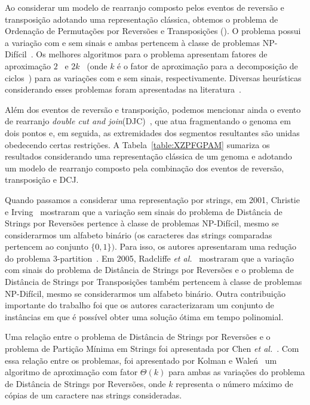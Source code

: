 Ao considerar um modelo de rearranjo composto pelos eventos de reversão e transposição adotando uma representação clássica, obtemos o problema de Ordenação de Permutações por Reversões e Transposições (\SbRT). O problema possui a variação com e sem sinais e ambas pertencem à classe de problemas NP-Difícil~\cite{2019b-oliveira-etal}. Os melhores algoritmos para o problema apresentam fatores de aproximação $2$~\cite{1998-walter-etal} e $2k$~\cite{2008-rahman-etal} (onde $k$ é o fator de aproximação para a decomposição de ciclos~\cite{2013-chen}) para as variações com e sem sinais, respectivamente. Diversas heurísticas considerando esses problemas foram apresentadas na literatura~\cite{2014a-dias-etal,2018-brito-etal}.

Além dos eventos de reversão e transposição, podemos mencionar ainda o evento de rearranjo \emph{double cut and join}(DJC)~\cite{2005-yancopoulos-etal}, que atua fragmentando o genoma em dois pontos e, em seguida, as extremidades dos segmentos resultantes são unidas obedecendo certas restrições. A Tabela~\ref{table:XZPFGPAM} sumariza os resultados considerando uma representação clássica de um genoma e adotando um modelo de rearranjo composto pela combinação dos eventos de reversão, transposição e DCJ. 



Quando passamos a considerar uma representação por strings, em 2001, Christie e Irving~\cite{2001-christie-irving} mostraram que a variação sem sinais do problema de Distância de Strings por Reversões pertence à classe de problemas NP-Difícil, mesmo se considerarmos um alfabeto binário (os caracteres das strings comparadas pertencem ao conjunto $\{0,1\})$. Para isso, os autores apresentaram uma redução do problema 3-partition~\cite{1990-garey-johnson}. Em 2005, Radcliffe \textit{et al.}~\cite{2005-radcliffe-etal} mostraram que a variação com sinais do problema de Distância de Strings por Reversões e o problema de Distância de Strings por Transposições também pertencem à classe de problemas NP-Difícil, mesmo se considerarmos um alfabeto binário. Outra contribuição importante do trabalho foi que os autores caracterizaram um conjunto de instâncias em que é possível obter uma solução ótima em tempo polinomial.

Uma relação entre o problema de Distância de Strings por Reversões e o problema de Partição Mínima em Strings foi apresentada por Chen \textit{et al.}~\cite{2005-chen-etal}. Com essa relação entre os problemas, foi apresentado por Kolman e Wale{\'n}~\cite{2006-kolman-walen} um algoritmo de aproximação com fator $\Theta(k)$ para ambas as variações do problema de Distância de Strings por Reversões, onde $k$ representa o número máximo de cópias de um caractere nas strings consideradas.

